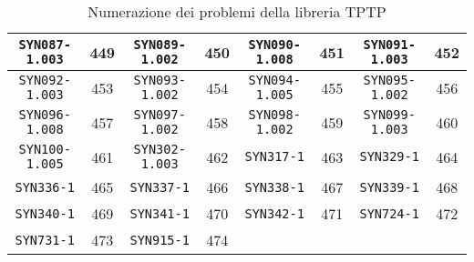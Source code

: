 \begin{table}[H]
{\begin{tabular}{|c|c|c|c|c|c|c|c|}
\hline
\texttt{SYN087-1.003} & 449 & \texttt{SYN089-1.002} & 450 & \texttt{SYN090-1.008} & 451 & \texttt{SYN091-1.003} & 452\\
\hline
\texttt{SYN092-1.003} & 453 & \texttt{SYN093-1.002} & 454 & \texttt{SYN094-1.005} & 455 & \texttt{SYN095-1.002} & 456\\
\hline
\texttt{SYN096-1.008} & 457 & \texttt{SYN097-1.002} & 458 & \texttt{SYN098-1.002} & 459 & \texttt{SYN099-1.003} & 460\\
\hline
\texttt{SYN100-1.005} & 461 & \texttt{SYN302-1.003} & 462 & \texttt{SYN317-1} & 463 & \texttt{SYN329-1} & 464\\
\hline
\texttt{SYN336-1} & 465 & \texttt{SYN337-1} & 466 & \texttt{SYN338-1} & 467 & \texttt{SYN339-1} & 468\\
\hline
\texttt{SYN340-1} & 469 & \texttt{SYN341-1} & 470 & \texttt{SYN342-1} & 471 & \texttt{SYN724-1} & 472\\
\hline
\texttt{SYN731-1} & 473 & \texttt{SYN915-1} & 474 &  & & &\\
\hline
\end{tabular}
}
\caption{Numerazione dei problemi della libreria TPTP} \label{tab:numerazione_problemi}
\end{table}
